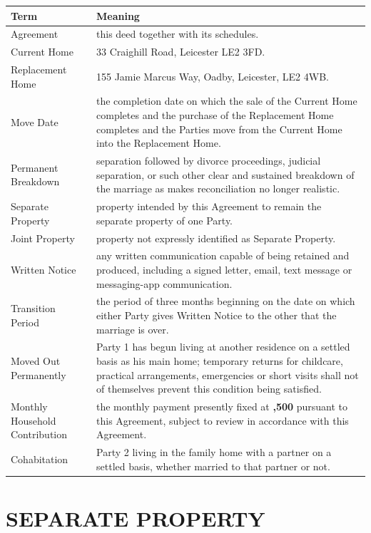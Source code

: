 \documentclass[10pt,a4paper]{article}
\newcommand{\CurrentHome}{33 Craighill Road, Leicester LE2 3FD}
\newcommand{\ReplacementHome}{155 Jamie Marcus Way, Oadby, Leicester, LE2 4WB}
\begin{document}
\begin{longtable}{p{}p{}}
\toprule
\textbf{Term} & \textbf{Meaning} \\
\midrule
Agreement & this deed together with its schedules. \\
Current Home & \CurrentHome. \\
Replacement Home & \ReplacementHome. \\
Move Date & the completion date on which the sale of the Current Home completes and the purchase of the Replacement Home completes and the Parties move from the Current Home into the Replacement Home. \\
Permanent Breakdown & separation followed by divorce proceedings, judicial separation, or such other clear and sustained breakdown of the marriage as makes reconciliation no longer realistic. \\
Separate Property & property intended by this Agreement to remain the separate property of one Party. \\
Joint Property & property not expressly identified as Separate Property. \\
Written Notice & any written communication capable of being retained and produced, including a signed letter, email, text message or messaging-app communication. \\
Transition Period & the period of three months beginning on the date on which either Party gives Written Notice to the other that the marriage is over. \\
Moved Out Permanently & Party 1 has begun living at another residence on a settled basis as his main home; temporary returns for childcare, practical arrangements, emergencies or short visits shall not of themselves prevent this condition being satisfied. \\
Monthly Household Contribution & the monthly payment presently fixed at \textbf{\textsterling 3,500} pursuant to this Agreement, subject to review in accordance with this Agreement. \\
Cohabitation & Party 2 living in the family home with a partner on a settled basis, whether married to that partner or not. \\
\bottomrule
\end{longtable}

\section*{SEPARATE PROPERTY}
\end{document}
